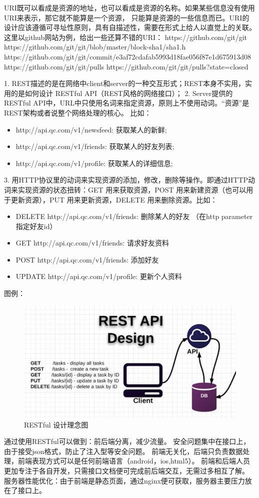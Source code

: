 URI既可以看成是资源的地址，也可以看成是资源的名称。如果某些信息没有使用URI来表示，那它就不能算是一个资源， 只能算是资源的一些信息而已。URI的设计应该遵循可寻址性原则，具有自描述性，需要在形式上给人以直觉上的关联。这里以github网站为例，给出一些还算不错的URI：
https://github.com/git/git
https://github.com/git/git/blob/master/block-sha1/sha1.h
https://github.com/git/git/commit/e3af72cdafab5993d18fae056f87e1d675913d08
https://github.com/git/git/pulls
https://github.com/git/git/pulls?state=closed

1. REST描述的是在网络中client和server的一种交互形式；REST本身不实用，实用的是如何设计 RESTful API（REST风格的网络接口）；
2. Server提供的RESTful API中，URL中只使用名词来指定资源，原则上不使用动词。“资源”是REST架构或者说整个网络处理的核心。
比如：
\begin{itemize}
	\item http://api.qc.com/v1/newsfeed: 获取某人的新鲜; 
	\item http://api.qc.com/v1/friends: 获取某人的好友列表;
	\item http://api.qc.com/v1/profile: 获取某人的详细信息;
\end{itemize}

3. 用HTTP协议里的动词来实现资源的添加，修改，删除等操作。即通过HTTP动词来实现资源的状态扭转：GET 用来获取资源，POST 用来新建资源（也可以用于更新资源），PUT 用来更新资源，DELETE 用来删除资源。比如：
\begin{itemize}
	\item DELETE http://api.qc.com/v1/friends: 删除某人的好友 （在http parameter指定好友id）
	\item GET  http://api.qc.com/v1/friends: 请求好友资料
	\item POST http://api.qc.com/v1/friends: 添加好友
	\item UPDATE http://api.qc.com/v1/profile: 更新个人资料
\end{itemize}

图例：
\begin{figure}[H]
	\centering
	\includegraphics[width=0.85\linewidth]{figure/3-2}
	\caption{RESTful 设计理念图}
	\label{fig:3-2}
\end{figure}

通过使用RESTful可以做到：前后端分离，减少流量。
安全问题集中在接口上，由于接受json格式，防止了注入型等安全问题。
前端无关化，后端只负责数据处理，前端表现方式可以是任何前端语言（android，ios,html5）。
前端和后端人员更加专注于各自开发，只需接口文档便可完成前后端交互，无需过多相互了解。
服务器性能优化：由于前端是静态页面，通过nginx便可获取，服务器主要压力放在了接口上。

